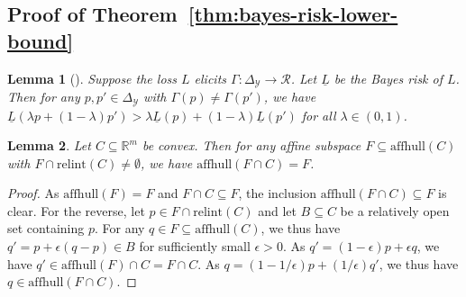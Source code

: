 \documentclass{article}
\newcommand{\Comments}{1}
\newcommand{\mynote}[2]{\ifnum\Comments=1\textcolor{#1}{#2}\fi}
\newcommand{\raf}[1]{\mynote{green!80!blue}{[RF: #1]}}
\newcommand{\bo}[1]{\mynote{blue}{[Bo: #1]}}
\newcommand{\reals}{\mathbb{R}}
\newcommand{\simplex}{\Delta_\Y}
\newcommand{\relint}[1]{\mathrm{relint}(#1)}
\newcommand{\affhull}{\mathrm{affhull}}
\newcommand{\R}{\mathcal{R}}
\newcommand{\Y}{\mathcal{Y}}
\newcommand{\lbar}{\underline{L}} %
\newtheorem{lemma}{Lemma}
\begin{document}
\subsection{Proof of Theorem~\ref{thm:bayes-risk-lower-bound}}

\begin{lemma}[\citep{frongillo2018elicitation}]
	\label{lem:elic-complex-bayes-concave}
	Suppose the loss $L$ elicits $\Gamma:\simplex\to\R$.
	Let $\lbar$ be the Bayes risk of $L$.
	Then for any $p,p'\in\simplex$ with $\Gamma(p)\neq\Gamma(p')$, we have $\lbar(\lambda p + (1-\lambda) p') > \lambda \lbar(p) + (1-\lambda) \lbar(p')$ for all $\lambda\in(0,1)$.
\end{lemma}


\begin{lemma}\label{lem:affhull-relint}
	Let $C\subseteq\reals^m$ be convex.
	Then for any affine subspace $F\subseteq\affhull(C)$ with $F\cap\relint C \neq \emptyset$, we have $\affhull(F\cap C) = F$.
\end{lemma}
\begin{proof}
	As $\affhull(F) = F$ and $F\cap C\subseteq F$, the inclusion $\affhull(F\cap C) \subseteq F$ is clear.
	For the reverse, let $p\in F\cap\relint C$ and let $B\subseteq C$ be a relatively open set containing $p$.
	For any $q\in F \subseteq \affhull(C)$, we thus have $q' = p + \epsilon (q-p) \in B$ for sufficiently small $\epsilon > 0$.
	As $q' = (1-\epsilon) p + \epsilon q$, we have $q' \in \affhull(F)\cap C = F\cap C$.
	As $q = (1-1/\epsilon) p + (1/\epsilon) q'$, we thus have $q\in\affhull(F\cap C)$.
\end{proof}
\end{document}
